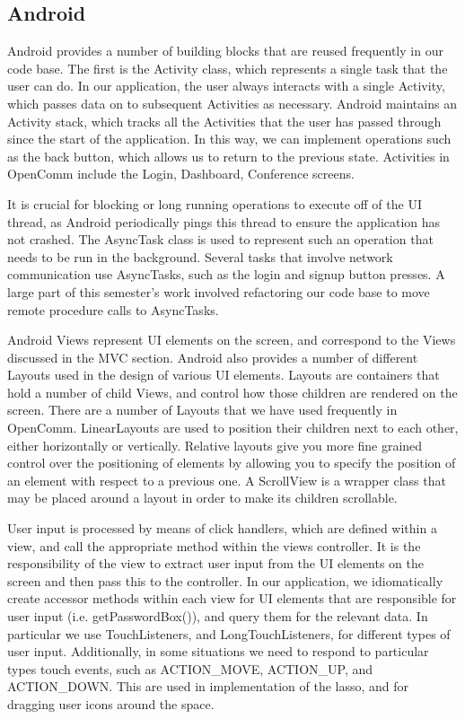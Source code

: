 \documentclass[12pt, letterpaper]{article}
\begin{document}
\subsection{Android}
Android provides a number of building blocks that are reused frequently in our code base. The first is the Activity class, which represents a single task that the user can do. In our application, the user always interacts with a single Activity, which passes data on to subsequent Activities as necessary. Android maintains an Activity stack, which tracks all the Activities that the user has passed through since the start of the application. In this way, we can implement operations such as the back button, which allows us to return to the previous state. Activities in OpenComm include the Login, Dashboard, Conference screens.

It is crucial for blocking or long running operations to execute off of the UI thread, as Android periodically pings this thread to ensure the application has not crashed. The AsyncTask class is used to represent such an operation that needs to be run in the background. Several tasks that involve network communication use AsyncTasks, such as the login and signup button presses. A large part of this semester’s work involved refactoring our code base to move remote procedure calls to AsyncTasks.

Android Views represent UI elements on the screen, and correspond to the Views discussed in the MVC section. Android also provides a number of different Layouts used in the design of various UI elements. Layouts are containers that hold a number of child Views, and control how those children are rendered on the screen. There are a number of Layouts that we have used frequently in OpenComm. LinearLayouts are used to position their children next to each other, either horizontally or vertically. Relative layouts give you more fine grained control over the positioning of elements by allowing you to specify the position of an element with respect to a previous one. A ScrollView is a wrapper class that may be placed around a layout in order to make its children scrollable.

User input is processed by means of click handlers, which are defined within a view, and call the appropriate method within the views controller. It is the responsibility of the view to extract user input from the UI elements on the screen and then pass this to the controller. In our application, we idiomatically create accessor methods within each view for UI elements that are responsible for user input (i.e. getPasswordBox()), and query them for the relevant data. In particular we use TouchListeners, and LongTouchListeners, for different types of user input. Additionally, in some situations we need to respond to particular types touch events, such as ACTION\_MOVE, ACTION\_UP, and ACTION\_DOWN. This are used in implementation of the lasso, and for dragging user icons around the space.
\end{document}
